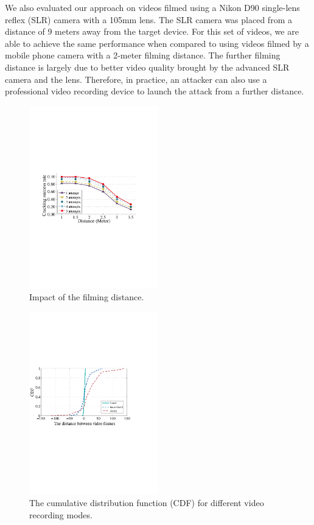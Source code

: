             We also evaluated our approach on videos filmed using a Nikon D90
            single-lens reflex (SLR) camera with a 105mm lens. The SLR camera
            was placed from a distance of 9 meters away from the target
            device. For this set of videos, we are able to achieve the same
            performance when compared to using videos filmed by a mobile
            phone camera with a 2-meter filming distance. The further filming
            distance is largely due to better video quality brought by the advanced
            SLR camera and the lens. Therefore, in practice, an attacker can
            also use a professional video recording device to launch the
            attack from a further distance.
        \begin{figure}[t!]
            \centering
            \includegraphics[width=0.5\textwidth]{fig/12.pdf}
            \caption{Impact of the filming distance.}
            \label{fig:fig12}
        \end{figure}

\begin{figure}[t!]
    \centering
    \includegraphics[width=0.5\textwidth]{fig/13.pdf}
    \caption{The cumulative distribution function (CDF) for different video recording modes.}
    \label{fig:fig13}
\end{figure}

